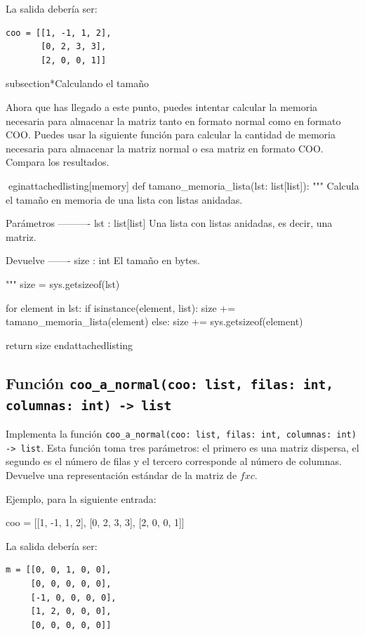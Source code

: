 \documentclass[10pt,a4paper]{article}
\begin{document}
La salida debería ser:
\begin{lstlisting}
coo = [[1, -1, 1, 2],
       [0, 2, 3, 3],
       [2, 0, 0, 1]]
\end{lstlisting}


subsection*{Calculando el tamaño}

Ahora que has llegado a este punto, puedes intentar calcular la memoria necesaria para almacenar la matriz tanto en formato normal como en formato COO. Puedes usar la siguiente función para calcular la cantidad de memoria necesaria para almacenar la matriz normal o esa matriz en formato COO. Compara los resultados.

egin{attachedlisting}[memory]
def tamano_memoria_lista(lst: list[list]):
    """
    Calcula el tamaño en memoria de una lista con listas anidadas.

    Parámetros
    ----------
    lst : list[list]
        Una lista con listas anidadas, es decir, una matriz.

    Devuelve
    -------
    size : int
        El tamaño en bytes.

    """
    size = sys.getsizeof(lst)

    for element in lst:
        if isinstance(element, list):
            size += tamano_memoria_lista(element)
        else:
            size += sys.getsizeof(element)

    return size
end{attachedlisting}

\subsection*{Función \lstinline|coo_a_normal(coo: list, filas: int, columnas: int) -> list|}
Implementa la función \lstinline|coo_a_normal(coo: list, filas: int, columnas: int) -> list|. Esta función toma tres parámetros: el primero es una matriz dispersa, el segundo es el número de filas y el tercero corresponde al número de columnas. Devuelve una representación estándar de la matriz de $f x c$.

Ejemplo, para la siguiente entrada:

\begin{attachedlisting}[sparse3]
coo = [[1, -1, 1, 2],
       [0, 2, 3, 3],
       [2, 0, 0, 1]]
\end{attachedlisting}

La salida debería ser:
\begin{lstlisting}
m = [[0, 0, 1, 0, 0],
     [0, 0, 0, 0, 0],
     [-1, 0, 0, 0, 0],
     [1, 2, 0, 0, 0],
     [0, 0, 0, 0, 0]]
\end{lstlisting}
\end{document}
